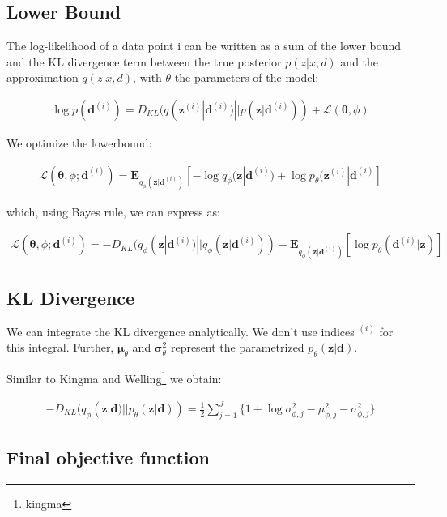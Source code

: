 \documentclass{article}
\begin{document}
\subsection{Lower Bound}

The log-likelihood of a data point i can be written as a sum of the lower bound and the KL divergence term between the true posterior $p(z|x,d)$ and the approximation $q(z|x,d)$, with $\theta$ the parameters of the model:

\begin{align*}
	\log p(\mathbf{d}^{(i)}) = D_{KL}(q(\mathbf{z}^{(i)}|\mathbf{d}^{(i)}) || p(\mathbf{z}|\mathbf{d}^{(i)})) + \mathcal{L}(\mathbf{\theta}, \phi)
\end{align*}

We optimize the lowerbound: 

\begin{align}
\mathcal{L}(\mathbf{\theta}, \phi; \mathbf{d}^{(i)}) = 
\mathbf{E}_{q_\phi (\mathbf{z}|\mathbf{d}^{(i)})}[-\log q_\phi (\mathbf{z}| \mathbf{d}^{(i)})+\log p_\theta(\mathbf{z}^{(i)}|\mathbf{d}^{(i)} ]
\end{align}

which, using Bayes rule, we can express as:

\begin{align}
\mathcal{L}(\mathbf{\theta}, \phi; \mathbf{d}^{(i)}) = -D_{KL}(q_\phi (\mathbf{z}| \mathbf{d}^{(i)})||q_\phi (\mathbf{z}| \mathbf{d}^{(i)})) + \mathbf{E}_{q_\phi(\mathbf{z}|\mathbf{d}^{(i)})}[\log p_\theta (\mathbf{d}^{(i)}|\mathbf{z})]
\end{align}


\subsection{KL Divergence}

We can integrate the KL divergence analytically. We don't use indices $^{(i)}$ for this integral. Further, $\mathbf{\mu}_\theta$ and $\mathbf{\sigma}_\theta^2$ represent the parametrized $p_\theta(\mathbf{z}|\mathbf{d})$.

Similar to Kingma and Welling\footnote{kingma} we obtain:

\begin{align}
- D_{KL}(q_\phi (\mathbf{z}| \mathbf{d})||p_\theta (\mathbf{z}| \mathbf{d})) = \frac{1}{2}\sum\limits_{j=1}^{J}\{1+\log \sigma_{\phi ,j}^2 - \mu_{\phi,j}^2 - \sigma_{\phi ,j}^2\}
\end{align}

\subsection{Final objective function}
\end{document}
